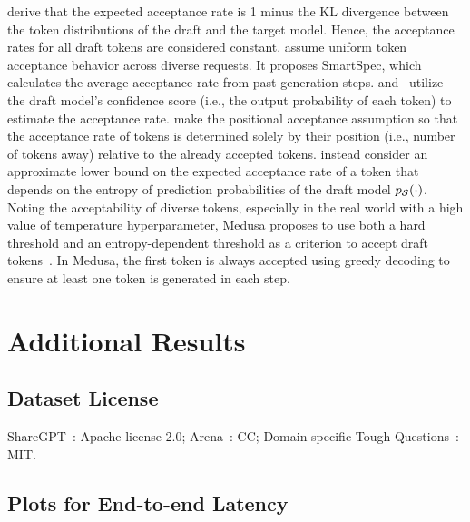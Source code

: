 \citet{leviathan2023} derive that the expected acceptance rate is 1 minus the KL divergence between the token distributions of the draft and the target model.
Hence, the acceptance rates for all draft tokens are considered constant.
\citet{liu2024optimizingspeculativedecodingserving} assume uniform token acceptance behavior across diverse requests.
It proposes SmartSpec, which calculates the average acceptance rate from past generation steps.
\citet{li2024eagle2} and~\citet{wang2024opttreespeculativedecodingadaptive} utilize the draft model's confidence score (i.e., the output probability of each token) to estimate the acceptance rate.
\citet{chen2024sequoia} make the positional acceptance assumption so that the acceptance rate of tokens is determined solely by their position (i.e., number of tokens away) relative to the already accepted tokens.
\citet{agrawal2024adaedlearlydraftstopping} instead consider an approximate lower bound on the expected acceptance rate of a token that depends on the entropy of prediction probabilities of the draft model $p_{\mathcal{S}}(\cdot)$.
Noting the acceptability of diverse tokens, especially in the real world with a high value of temperature hyperparameter, Medusa proposes to use both a hard threshold and an entropy-dependent threshold as a criterion to accept draft tokens~\citep{cai2024medusa}.
In Medusa, the first token is always accepted using greedy decoding to ensure at least one token is generated in each step.

\section{Additional Results}

\subsection{Dataset License}
ShareGPT~\citep{sharegpt-dataset}: Apache license 2.0; Arena~\citep{zheng2023arena}: CC; Domain-specific Tough Questions~\citep{yav-ai2024domain-tough}: MIT.

\subsection{Plots for End-to-end Latency}\label{app:latency-plots}

